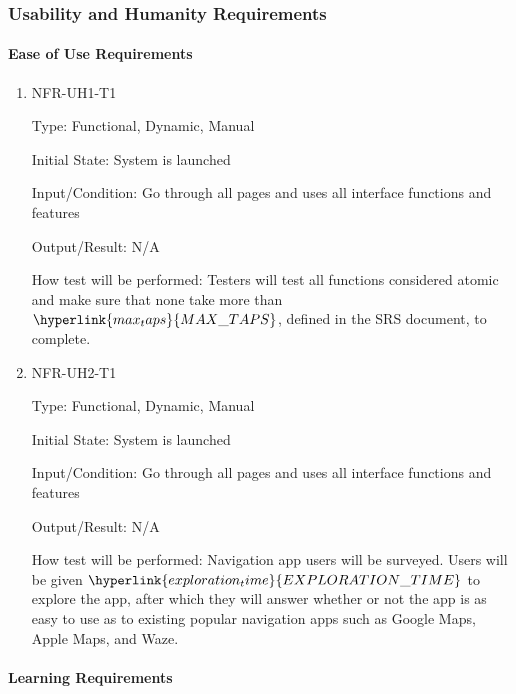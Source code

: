 \documentclass[12pt, titlepage]{article}
\begin{document}
\subsubsection{Usability and Humanity Requirements}
\label{sec:5.2.2}
\paragraph{Ease of Use Requirements}

\begin{enumerate}

\item{NFR-UH1-T1}

Type: Functional, Dynamic, Manual
					
Initial State: System is launched
					
Input/Condition: Go through all pages and uses all interface functions and
features
					
Output/Result: N/A
					
How test will be performed: Testers will test all functions considered atomic
and make sure that none take more than $\hyperlink{max_taps}{MAX\_TAPS}$,
defined in the SRS document, to complete.
				
\item{NFR-UH2-T1}

Type: Functional, Dynamic, Manual
					
Initial State: System is launched
					
Input/Condition: Go through all pages and uses all interface functions and
features
					
Output/Result: N/A
					
How test will be performed: Navigation app users will be surveyed. Users will be
given $\hyperlink{exploration_time}{EXPLORATION\_TIME}$ to explore the app,
after which they will answer whether or not the app is as easy to use as to
existing popular navigation apps such as Google Maps, Apple Maps, and Waze.
\color{red}{At least 5 users will be surveyed. At least 80\% of users surveyed
should indicate that it is as easy to use.}
					
\end{enumerate}

\paragraph{Learning Requirements}
\end{document}
